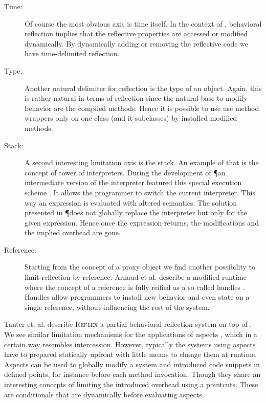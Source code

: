 \begin{description}
\item[Time:] Of course the most obvious axis is time itself.
	In the context of \ST, behavioral reflection implies that the reflective properties are accessed or modified dynamically.
	By dynamically adding or removing the reflective code we have time-delimited reflection.
	
\item[Type:] Another natural delimiter for reflection is the type of an object.
	Again, this is rather natural in terms of \ST reflection since the natural base to modify behavior are the compiled methods.
	Hence it is possible to use use method wrappers only on one class (and it subclasses) by installed modified methods.

\item[Stack:] A second interesting limitation axis is the stack.
	An example of that is the concept of tower of interpreters.
	During the development of \P an intermediate version of the \ST interpreter featured this special execution scheme \cite{Verw10a}.
	It allows the programmer to switch the current interpreter.
	This way an expression is evaluated with altered semantics.
	The solution presented in \P does not globally replace the interpreter but only for the given expression. 
	Hence once the expression returns, the modifications and the implied overhead are gone.

\item[Reference:] Starting from the concept of a proxy object we find another possibility to limit reflection by reference.
	Arnaud et al. describe a modified \PH runtime where the concept of a reference is fully reified as a so called handles \cite{Arna13a}.
	Handles allow programmers to install new behavior and even state on a single reference, without influencing the rest of the system.
\end{description}
%

\noindent Tanter et. al. describe \textsc{Reflex} \cite{Tant03a} a partial behavioral reflection system on top of \Java.
We see similar limitation mechanisms for the applications of aspects \cite{Kicz01a}, which in a certain way resembles intercession.
However, typically the systems using aspects have to prepared statically upfront with little means to change them at runtime.
Aspects can be used to globally modify a system and introduced code snippets in defined points, for instance before each method invocation.
Though they share an interesting concepts of limiting the introduced overhead using a pointcuts.
These are conditionals that are dynamically before evaluating aspects.

